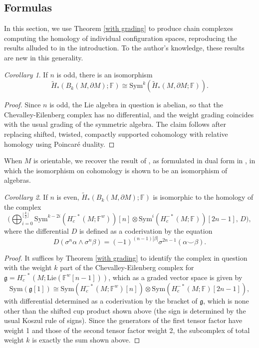 \documentclass{compositio}
\theoremstyle{definition}\newtheorem{definition}{Definition}[section]
\theoremstyle{theorem}\newtheorem{lemma}[definition]{Lemma}
\theoremstyle{remark}\newtheorem*{conventions}{Conventions}
\theoremstyle{remark}\newtheorem*{acknowledgments}{Acknowledgments}
\theoremstyle{remark}\newtheorem*{outline}{Outline}
\theoremstyle{remark}\newtheorem*{questions}{Questions}
\theoremstyle{remark}\newtheorem{example}[definition]{Example}
\theoremstyle{definition}\newtheorem{construction}[definition]{Construction}
\theoremstyle{definition}\newtheorem*{convention}{Convention}
\theoremstyle{definition}\newtheorem*{conjecture}{Conjecture}
\theoremstyle{theorem}\newtheorem{theorem}[definition]{Theorem}
\theoremstyle{theorem}\newtheorem{paradigm}[definition]{Paradigm}
\theoremstyle{remark}\newtheorem{remark}[definition]{Remark}
\theoremstyle{corollary}\newtheorem{corollary}[definition]{Corollary}
\theoremstyle{theorem}\newtheorem{proposition}[definition]{Proposition}
\theoremstyle{definition}\newtheorem{question}[definition]{Question}
\begin{document}
\subsection{Formulas}\label{formulas} In this section, we use Theorem \ref{with grading} to produce chain complexes computing the homology of individual configuration spaces, reproducing the results alluded to in the introduction. To the author's knowledge, these results are new in this generality.

\begin{corollary}
If $n$ is odd, there is an isomorphism $$\widetilde{H}_*(B_k(M,\partial M);\mathbb{F})\cong {\mathrm{Sym}}^k(\widetilde{H}_*(M,\partial M;\mathbb{F})).$$
\end{corollary}
\begin{proof}
Since $n$ is odd, the Lie algebra in question is abelian, so that the Chevalley-Eilenberg complex has no differential, and the weight grading coincides with the usual grading of the symmetric algebra. The claim follows after replacing shifted, twisted, compactly supported cohomology with relative homology using Poincar\'{e} duality.
\end{proof}

When $M$ is orientable, we recover the result of \cite{BCT}, as formulated in dual form in \cite{FelixTanre}, in which the isomorphism on cohomology is shown to be an isomorphism of algebras.

\begin{corollary}
If $n$ is even, $\widetilde{H}_*(B_k(M,\partial M);\mathbb{F})$ is isomorphic to the homology of the complex $$\bigg(\bigoplus_{i=0}^{\lfloor\frac{k}{2}\rfloor}{\mathrm{Sym}}^{k-2i}(H^{-*}_c(M;\mathbb{F}^w))[n]\otimes{\mathrm{Sym}}^{i}(H^{-*}_c(M;\mathbb{F}))[2n-1],\,D\bigg),$$ where the differential $D$ is defined as a coderivation by the equation $$D(\sigma^n\alpha\wedge\sigma^n\beta)=(-1)^{(n-1)|\beta|}\sigma^{2n-1}(\alpha\smile\beta).$$
\end{corollary}
\begin{proof}
It suffices by Theorem \ref{with grading} to identify the complex in question with the weight $k$ part of the Chevalley-Eilenberg complex for $\mathfrak{g}=H_c^{-*}(M;{\mathrm{Lie}}(\mathbb{F}^w[n-1]))$, which as a graded vector space is given by $${\mathrm{Sym}}(\mathfrak{g}[1])\cong{\mathrm{Sym}}(H_c^{-*}(M;\mathbb{F}^w)[n])\otimes {\mathrm{Sym}}(H_c^{-*}(M;\mathbb{F})[2n-1]),$$ with differential determined as a coderivation by the bracket of $\mathfrak{g}$, which is none other than the shifted cup product shown above (the sign is determined by the usual Koszul rule of signs). Since the generators of the first tensor factor have weight 1 and those of the second tensor factor weight 2, the subcomplex of total weight $k$ is exactly the sum shown above. 
\end{proof}
\end{document}
